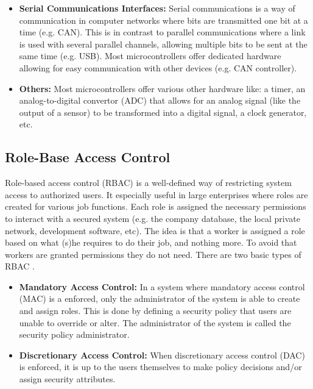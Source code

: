 \begin{itemize}
	\item \textbf{Serial Communications Interfaces:} Serial communications is a way of communication in computer networks where bits are transmitted one bit at a time (e.g. CAN). This is in contrast to parallel communications where a link is used with several parallel channels, allowing multiple bits to be sent at the same time (e.g. USB). Most microcontrollers offer dedicated hardware allowing for easy communication with other devices (e.g. CAN controller).
	
	\item \textbf{Others:} Most microcontrollers offer various other hardware like: a timer, an analog-to-digital convertor (ADC) that allows for an analog signal (like the output of a sensor) to be transformed into a digital signal, a clock generator, etc.
\end{itemize}

\subsection{Role-Base Access Control}
\label{sec:RBAC}

Role-based access control (RBAC) is a well-defined way of restricting system access to authorized users. It especially useful in large enterprises where roles are created for various job functions. Each role is assigned the necessary permissions to interact with a secured system (e.g. the company database, the local private network, development software, etc). The idea is that a worker is assigned a role based on what (s)he requires to do their job, and nothing more. To avoid that workers are granted permissions they do not need. There are two basic types of RBAC \cite{wiki:RBAC}.

\begin{itemize}
	\item \textbf{Mandatory Access Control:} In a system where mandatory access control (MAC) is a enforced, only the administrator of the system is able to create and assign roles. This is done by defining a security policy that users are unable to override or alter. The administrator of the system is called the security policy administrator.
	
	\item \textbf{Discretionary Access Control:} When discretionary access control (DAC) is enforced, it is up to the users themselves to make policy decisions and/or assign security attributes.
\end{itemize}

